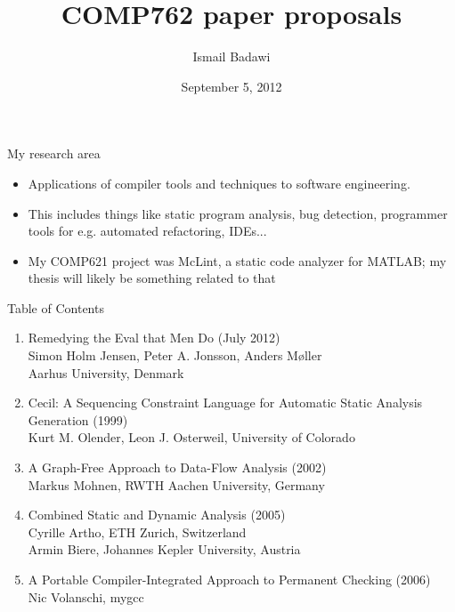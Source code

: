 \documentclass{beamer}
\title[COMP762 paper proposals]{COMP762 paper proposals}
\date{September 5, 2012}
\author{Ismail Badawi}
\begin{document}
\begin{frame}
\titlepage
\end{frame}



\begin{frame}{My research area}
\begin{itemize}
\item Applications of compiler tools and techniques to software engineering.
\item This includes things like static program analysis, bug detection, 
programmer tools for e.g. automated refactoring, IDEs...
\item My COMP621 project was McLint, a static code analyzer for MATLAB;
my thesis will likely be something related to that
\end{itemize}
\end{frame}

\begin{frame}{Table of Contents}
\begin{enumerate}
\item Remedying the Eval that Men Do (July 2012) \\ Simon Holm Jensen, Peter A. Jonsson, Anders M\o ller \\ Aarhus University, Denmark
\item Cecil: A Sequencing Constraint Language for Automatic Static Analysis
Generation (1999) \\ Kurt M. Olender, Leon J. Osterweil, University of Colorado
\item A Graph-Free Approach to Data-Flow Analysis (2002) \\ Markus Mohnen, RWTH Aachen University, Germany
\item Combined Static and Dynamic Analysis (2005) \\ Cyrille Artho, ETH Zurich, Switzerland \\ Armin Biere, Johannes Kepler University, Austria
\item A Portable Compiler-Integrated Approach to Permanent Checking (2006) \\ Nic Volanschi, mygcc
\end{enumerate}
\end{frame}
\end{document}
